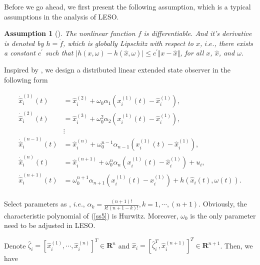 \documentclass[english]{cccconf}
\newtheorem{assumption}{Assumption}
\begin{document}
  










Before we go ahead, we first present the following assumption, which is a typical assumptions in the analysis of LESO.

\begin{assumption}[\cite{Zheng2008}]\label{a2}
The nonlinear function $f$ is differentiable. And it's derivative is denoted by $h=\dot f$, which is globally Lipschitz with respect to $x$, $i.e.$, there exists a constant $c^{'}$ such that $\vert h(x,\omega) - h(\hat {x}, \omega) \vert \le c^{'} \Vert x - \hat x \Vert$, for all $x$, $\hat x$, and $\omega$.
\end{assumption}

Inspired by \cite{Zheng2008}, we design a distributed linear extended state observer in the following form

 \begin{equation}
  \label{ss5}
  \begin{aligned}
  {{\dot {\hat {x}}}}_i^{(1)} (t) &= {{\hat {x}}}_i^{(2)} + \omega_0 \alpha_1 (x_i^{(1)}(t) - {{\hat {x}}}_i^{(1)}),\\
  {{\dot {\hat {x}}}}_i^{(2)} (t) &= {{\hat {x}}}_i^{(3)} + \omega_0^{2} \alpha_2 (x_i^{(1)}(t) - {{\hat {x}}}_i^{(1)}),\\
  & \vdots \\
  {{\dot {\hat {x}}}}_i^{(n-1)} (t) &= {{\hat {x}}}_i^{(n)} + \omega_0^{n-1} \alpha_{n-1} (x_i^{(1)}(t) - {{\hat {x}}}_i^{(1)}),\\
  {{\dot {\hat {x}}}}_i^{(n)} (t) &= {{\hat {x}}}_i^{(n+1)} + \omega_0^{n} \alpha_n (x_i^{(1)}(t) - {{\hat {x}}}_i^{(1)})+u_i,\\
  {{\dot {\hat {x}}}}_i^{(n+1)}(t) &=\omega_0^{n+1} \alpha_{n+1} (x_i^{(1)}(t) - {{\hat {x}}}_i^{(1)}) + h(\hat x_i(t),\omega(t)).\\
  \end{aligned}
\end{equation}

Select parameters as \cite{Zheng2008}, $i.e.$, $\alpha_k=\frac{(n+1)!}{k!(n+1-k)!},k=1,\cdots,(n+1)$.
Obviously, the characteristic polynomial of (\ref{ss5}) is Hurwitz. Moreover, $\omega_0$ is the only parameter need to be adjusted in LESO.

Denote $\hat \zeta_i = \left[ \hat x_i^{(1)},\cdots,\hat x_i^{(n)} \right]^T \in \mathbf R^n$ and $\hat x_i=\left[\hat \zeta_i^{T},\hat x_i^{(n+1)} \right]^T \in \mathbf R^{n+1}$. Then, we have
\end{document}
